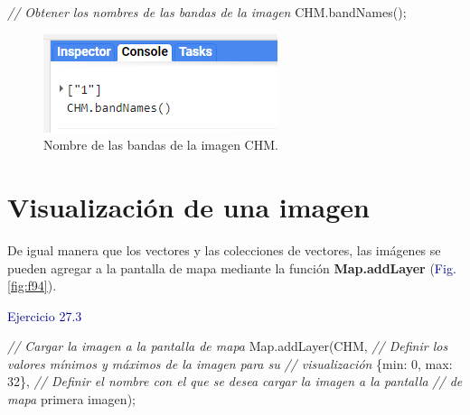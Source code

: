 \documentclass[
  12pt,
  letterpaper,
  twoside]{book}
\newenvironment{Shaded}{\begin{snugshade}}{\end{snugshade}}
\newcommand{\BuiltInTok}[1]{#1}
\newcommand{\CommentTok}[1]{\textcolor[rgb]{0.24,0.58,0.00}{\textit{#1}}}
\newcommand{\DataTypeTok}[1]{\textcolor[rgb]{0.00,0.00,0.00}{#1}}
\newcommand{\DecValTok}[1]{\textcolor[rgb]{0.28,0.53,0.93}{#1}}
\newcommand{\FunctionTok}[1]{\textcolor[rgb]{0.48,0.12,0.64}{#1}}
\newcommand{\NormalTok}[1]{#1}
\newcommand{\OperatorTok}[1]{\textcolor[rgb]{0.00,0.00,0.00}{#1}}
\newcommand{\StringTok}[1]{\textcolor[rgb]{0.87,0.29,0.22}{#1}}
\newcommand\boldpurple[1]{\textcolor{darkpurple}{\textbf{#1}}}
\begin{document}
\begin{Shaded}
\begin{Highlighting}[]
\CommentTok{// Obtener los nombres de las bandas de la imagen}
\NormalTok{CHM}\OperatorTok{.}\FunctionTok{bandNames}\NormalTok{()}\OperatorTok{;}
\end{Highlighting}
\end{Shaded}

\begin{figure}[H]

{\centering \includegraphics[width=0.8\linewidth]{Img/ej273} 

}

\caption{Nombre de las bandas de la imagen CHM.}\label{fig:f93}
\end{figure}

\hypertarget{visualizaciuxf3n-de-una-imagen}{%
\section{Visualización de una imagen}\label{visualizaciuxf3n-de-una-imagen}}

De igual manera que los vectores y las colecciones de vectores, las imágenes se pueden agregar a la pantalla de mapa mediante la función \boldpurple{Map.addLayer} (\textcolor{darkblue}{Fig.} \ref{fig:f94}).

\textcolor{darkblue}{Ejercicio 27.3}

\begin{Shaded}
\begin{Highlighting}[]
\CommentTok{// Cargar la imagen a la pantalla de mapa}
\BuiltInTok{Map}\OperatorTok{.}\FunctionTok{addLayer}\NormalTok{(CHM}\OperatorTok{,} 
  \CommentTok{// Definir los valores mínimos y máximos de la imagen para su }
  \CommentTok{// visualización}
\NormalTok{  \{}\DataTypeTok{min}\OperatorTok{:} \DecValTok{0}\OperatorTok{,} \DataTypeTok{max}\OperatorTok{:} \DecValTok{32}\NormalTok{\}}\OperatorTok{,} 
  \CommentTok{// Definir el nombre con el que se desea cargar la imagen a la pantalla }
  \CommentTok{// de mapa}
  \StringTok{\textquotesingle{}primera imagen\textquotesingle{}}\NormalTok{)}\OperatorTok{;}
\end{Highlighting}
\end{Shaded}
\end{document}
